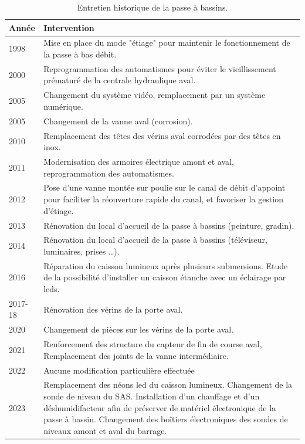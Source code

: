 \documentclass[11pt,twocolumn,titlepage,twoside]{article}\usepackage[]{graphicx}\usepackage[]{color}
\begin{document}
\begin{table}[htb]
\begin{tabular}{p{}p{}}
\toprule
Année & Intervention\\
\midrule
1998 & Mise en place du mode "étiage" pour maintenir le fonctionnement
de la passe à bas débit.\\
2000 & Reprogrammation des automatismes pour éviter le vieillissement
prématuré de la centrale hydraulique aval.\\
2005 & Changement du système vidéo, remplacement par un système
numérique. \\
2005 & Changement de la vanne aval (corrosion).\\
2010 &  Remplacement des têtes des vérins aval corrodées par des têtes en
inox.\\
2011 & Modernisation des armoires électrique amont et aval,
reprogrammation des automatismes.\\
2012 & Pose d'une vanne montée sur poulie sur le canal de débit d'appoint
pour faciliter la réouverture rapide du canal, et favoriser la gestion
d'étiage.\\
2013 & Rénovation du local d'accueil de la passe à bassins (peinture,
gradin).\\
2014 & Rénovation du local d'accueil de la passe à bassins (téléviseur,
luminaires, prises \ldots{}).\\
2016 & Réparation du caisson lumineux après plusieurs submersions. Etude
de la possibilité d'installer un caisson étanche avec un éclairage par
leds.\\
2017-18 & Rénovation des vérins de la porte aval.\\
2020 & Changement de pièces sur les vérins de la porte aval.\\
2021 & Renforcement des structure du capteur de fin de course aval, Remplacement
des joints de la vanne intermédiaire.\\
2022 & Aucune modification particulière effectuée\\
2023 & Remplacement des néons led du caisson lumineux. Changement de la sonde de niveau du SAS. Installation d’un chauffage et d’un déshumidifacteur afin de préserver de matériel électronique
de la passe à bassin. Changement des boîtiers électroniques des sondes de
niveaux amont et aval du barrage.\\
\bottomrule
\end{tabular}
\caption{Entretien historique de la passe à bassins.}
\label{table_entretien_passe}
\end{table}
\end{document}
